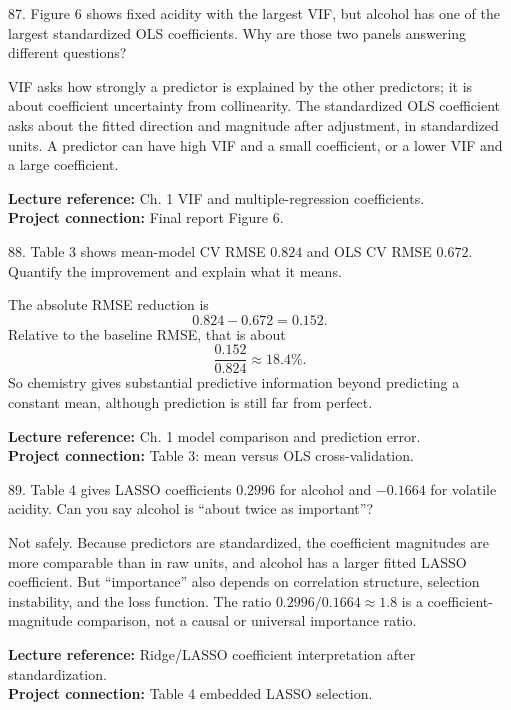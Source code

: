 \documentclass[10.5pt,a4paper]{article}
\newcommand{\chapref}[1]{\textbf{Lecture reference:} #1}
\newcommand{\projectref}[1]{\textbf{Project connection:} #1}
\begin{document}
\begin{qbox}{87. Figure 6 shows fixed acidity with the largest VIF, but alcohol has one of the largest standardized OLS coefficients. Why are those two panels answering different questions?}
\end{qbox}
\begin{answerbox}
VIF asks how strongly a predictor is explained by the other predictors; it is about coefficient uncertainty from collinearity. The standardized OLS coefficient asks about the fitted direction and magnitude after adjustment, in standardized units. A predictor can have high VIF and a small coefficient, or a lower VIF and a large coefficient.
\end{answerbox}
\begin{refbox}\chapref{Ch. 1 VIF and multiple-regression coefficients.}\\\projectref{Final report Figure 6.}\end{refbox}

\begin{qbox}{88. Table 3 shows mean-model CV RMSE \(0.824\) and OLS CV RMSE \(0.672\). Quantify the improvement and explain what it means.}
\end{qbox}
\begin{answerbox}
The absolute RMSE reduction is
\[
0.824-0.672=0.152.
\]
Relative to the baseline RMSE, that is about
\[
\frac{0.152}{0.824}\approx18.4\%.
\]
So chemistry gives substantial predictive information beyond predicting a constant mean, although prediction is still far from perfect.
\end{answerbox}
\begin{refbox}\chapref{Ch. 1 model comparison and prediction error.}\\\projectref{Table 3: mean versus OLS cross-validation.}\end{refbox}

\begin{qbox}{89. Table 4 gives LASSO coefficients \(0.2996\) for alcohol and \(-0.1664\) for volatile acidity. Can you say alcohol is ``about twice as important''?}
\end{qbox}
\begin{answerbox}
Not safely. Because predictors are standardized, the coefficient magnitudes are more comparable than in raw units, and alcohol has a larger fitted LASSO coefficient. But ``importance'' also depends on correlation structure, selection instability, and the loss function. The ratio \(0.2996/0.1664\approx1.8\) is a coefficient-magnitude comparison, not a causal or universal importance ratio.
\end{answerbox}
\begin{refbox}\chapref{Ridge/LASSO coefficient interpretation after standardization.}\\\projectref{Table 4 embedded LASSO selection.}\end{refbox}
\end{document}

